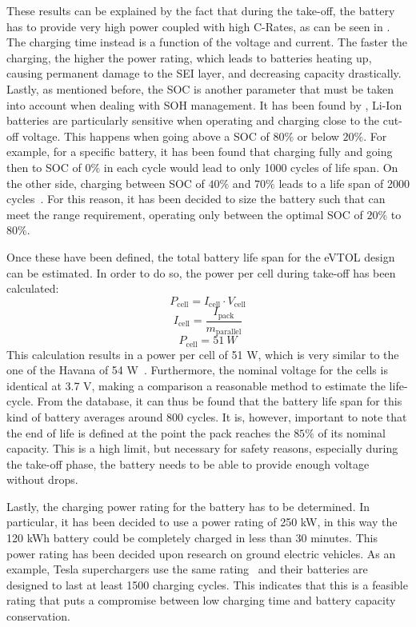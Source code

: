 These results can be explained by the fact
that during the take-off, the battery has to provide very high power coupled with high C-Rates, as can be seen in .
The charging time instead is a function of the voltage and current.
The faster the charging, the higher the power rating, which leads to batteries heating up,
causing permanent damage to the SEI layer, and decreasing capacity drastically.
Lastly, as mentioned before,
the SOC is another parameter that must be taken into account when dealing with SOH management.
It has been found by \cite{Li_2021},
Li-Ion batteries are particularly sensitive when operating and charging close to the cut-off voltage.
This happens when going above a SOC of $80\%$ or below $20\%$.
For example, for a specific battery, it has been found that charging fully and going then to SOC of $0\%$ in each cycle
would lead to only 1000 cycles of life span.
On the other side, charging between SOC of $40\%$ and $70\%$ leads to a life span of 2000 cycles~\cite{Li_2021}.
For this reason, it has been decided to size the battery such that can meet the range requirement,
operating only between the optimal SOC of $20\%$ to $80\%$.

Once these have been defined, the total battery life span for the eVTOL design can be estimated.
In order to do so, the power per cell during take-off has been calculated:
\begin{equation}
    P_\text{cell} = I_\text{cell} \cdot V_\text{cell}
\end{equation}
\begin{equation}
    I_\text{cell} = \frac{I_\text{pack}}{m_\text{parallel}}
\end{equation}
\begin{equation}
        P_\text{cell} = \qty{51}{W}
\end{equation}
This calculation results in a power per cell of 51 W,
which is very similar to the one of the Havana of 54 W~\cite{Li_2021}.
Furthermore, the nominal voltage for the cells is identical at 3.7 V,
making a comparison a reasonable method to estimate the life-cycle.
From the database, it can thus be found that the battery life span for this kind of battery averages around 800 cycles.
It is, however, important to note
that the end of life is defined at the point the pack reaches the $85\%$ of its nominal capacity.
This is a high limit, but necessary for safety reasons, especially during the take-off phase,
the battery needs to be able to provide enough voltage without drops.

Lastly, the charging power rating for the battery has to be determined.
In particular, it has been decided to use a power rating of 250 kW,
in this way the 120 kWh battery could be completely charged in less than 30 minutes.
This power rating has been decided upon research on ground electric vehicles.
As an example,
Tesla superchargers use the same rating~\cite{tesla1}
and their batteries are designed to last at least 1500 charging cycles.
This indicates
that this is a feasible rating that puts a compromise between low charging time and battery capacity conservation.

